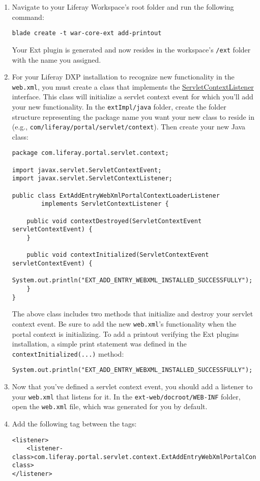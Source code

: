 \begin{enumerate}
\def\labelenumi{\arabic{enumi}.}
\item
  Navigate to your Liferay Workspace's root folder and run the following
  command:

\begin{verbatim}
blade create -t war-core-ext add-printout
\end{verbatim}

  Your Ext plugin is generated and now resides in the workspace's
  \texttt{/ext} folder with the name you assigned.
\item
  For your Liferay DXP installation to recognize new functionality in
  the \texttt{web.xml}, you must create a class that implements the
  \href{https://javaee.github.io/javaee-spec/javadocs/javax/servlet/ServletContextListener.html}{ServletContextListener}
  interface. This class will initialize a servlet context event for
  which you'll add your new functionality. In the \texttt{extImpl/java}
  folder, create the folder structure representing the package name you
  want your new class to reside in (e.g.,
  \texttt{com/liferay/portal/servlet/context}). Then create your new
  Java class:

\begin{verbatim}
package com.liferay.portal.servlet.context;

import javax.servlet.ServletContextEvent;
import javax.servlet.ServletContextListener;

public class ExtAddEntryWebXmlPortalContextLoaderListener
        implements ServletContextListener {

    public void contextDestroyed(ServletContextEvent servletContextEvent) {
    }

    public void contextInitialized(ServletContextEvent servletContextEvent) {
        System.out.println("EXT_ADD_ENTRY_WEBXML_INSTALLED_SUCCESSFULLY");
    }
}
\end{verbatim}

  The above class includes two methods that initialize and destroy your
  servlet context event. Be sure to add the new \texttt{web.xml}'s
  functionality when the portal context is initializing. To add a
  printout verifying the Ext plugins installation, a simple print
  statement was defined in the \texttt{contextInitialized(...)} method:

\begin{verbatim}
System.out.println("EXT_ADD_ENTRY_WEBXML_INSTALLED_SUCCESSFULLY");
\end{verbatim}
\item
  Now that you've defined a servlet context event, you should add a
  listener to your \texttt{web.xml} that listens for it. In the
  \texttt{ext-web/docroot/WEB-INF} folder, open the \texttt{web.xml}
  file, which was generated for you by default.
\item
  Add the following tag between the tags:

\begin{verbatim}
<listener>
    <listener-class>com.liferay.portal.servlet.context.ExtAddEntryWebXmlPortalContextLoaderListener</listener-class>
</listener>
\end{verbatim}
\end{enumerate}

